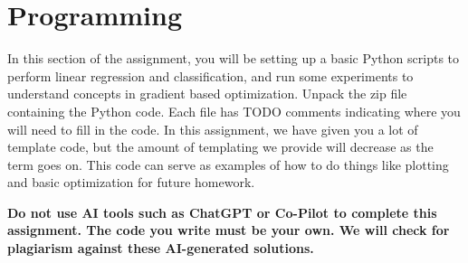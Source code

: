 \documentclass{article}
\begin{document}
\newpage
\section{Programming}
In this section of the assignment, you will be setting up a basic Python scripts to perform linear regression and classification, and run some experiments to understand concepts in gradient based optimization.  Unpack the zip file containing the Python code. Each file has TODO comments indicating where you will need to fill in the code. In this assignment, we have given you a lot of template code, but the amount of templating we provide will decrease as the term goes on. This code can serve as examples of how to do things like plotting and basic optimization for future homework.

\textbf{Do not use AI tools such as ChatGPT or Co-Pilot to complete this assignment. The code you write must be your own. We will check for plagiarism against these AI-generated solutions.}
\end{document}
